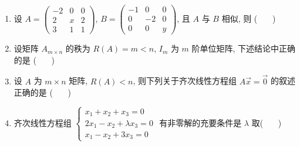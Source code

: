 \begin{enumerate}
	\item 设 $A = \begin{pmatrix} -2 & 0 & 0 \\ 2 & x & 2 \\ 3 & 1 & 1 \end{pmatrix}$, $B = \begin{pmatrix} -1 & 0 & 0 \\ 0 & -2 & 0 \\ 0 & 0 & y \end{pmatrix}$, 且 $A$ 与 $B$ 相似, 则 ( \ \ \ )
	\vspace{0.5em}
	
	\item 设矩阵 $A_{m \times n}$ 的秩为 $R(A) = m < n$, $I_m$ 为 $m$ 阶单位矩阵, 下述结论中正确的是 ( \ \ \ )
	\vspace{0.5em}
	
	\item 设 $A$ 为 $m \times n$ 矩阵, $R(A) < n$, 则下列关于齐次线性方程组 $A\vec{x}=\vec{0}$ 的叙述正确的是 ( \ \ \ )
	\vspace{0.5em}
	
	\item 齐次线性方程组 $\begin{cases} x_1+x_2+x_3=0 \\ 2x_1-x_2+\lambda x_3=0 \\ x_1-x_2+3x_3=0 \end{cases}$ 有非零解的充要条件是 $\lambda$ 取( \ \ \ )
	\vspace{0.5em}
	

\end{enumerate}
